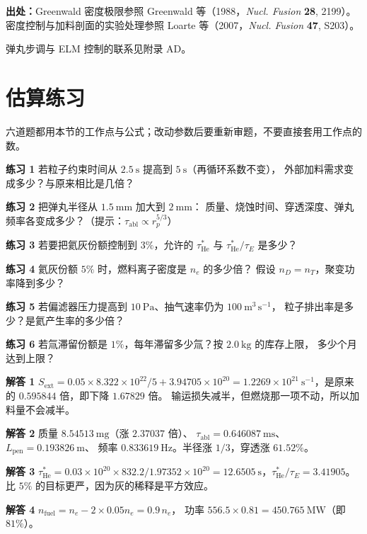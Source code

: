 {\footnotesize
\textbf{出处：}Greenwald 密度极限参照 Greenwald 等（1988，\emph{Nucl. Fusion} \textbf{28}, 2199）。
密度控制与加料剖面的实验处理参照 Loarte 等（2007，\emph{Nucl. Fusion} \textbf{47}, S203）。

弹丸步调与 ELM 控制的联系见附录 AD。
}

\section{估算练习}
\label{sec:app-aj-problems}

六道题都用本节的工作点与公式；改动参数后要重新审题，不要直接套用工作点的数。

\textbf{练习 1} 若粒子约束时间从 $2.5\ \mathrm{s}$ 提高到 $5\ \mathrm{s}$（再循环系数不变），
外部加料需求变成多少？与原来相比是几倍？

\textbf{练习 2} 把弹丸半径从 $1.5\ \mathrm{mm}$ 加大到 $2\ \mathrm{mm}$：
质量、烧蚀时间、穿透深度、弹丸频率各变成多少？（提示：$\tau_{\mathrm{abl}} \propto r_p^{5/3}$）

\textbf{练习 3} 若要把氦灰份额控制到 $3\%$，允许的 $\tau_{\mathrm{He}}^{*}$ 与
$\tau_{\mathrm{He}}^{*}/\tau_E$ 是多少？

\textbf{练习 4} 氦灰份额 $5\%$ 时，燃料离子密度是 $n_e$ 的多少倍？
假设 $n_D = n_T$，聚变功率降到多少？

\textbf{练习 5} 若偏滤器压力提高到 $10\ \mathrm{Pa}$、抽气速率仍为 $100\ \mathrm{m^{3}\,s^{-1}}$，
粒子排出率是多少？是氦产生率的多少倍？

\textbf{练习 6} 若氚滞留份额是 $1\%$，每年滞留多少氚？按 $2.0\ \mathrm{kg}$ 的库存上限，
多少个月达到上限？

\textbf{解答 1} $S_{\mathrm{ext}} = 0.05\times8.322\times10^{22}/5 + 3.94705\times10^{20}
= 1.2269\times10^{21}\ \mathrm{s^{-1}}$，是原来的 $0.595844$ 倍，即下降 $1.67829$ 倍。
输运损失减半，但燃烧那一项不动，所以加料量不会减半。

\textbf{解答 2} 质量 $8.54513\ \mathrm{mg}$（涨 $2.37037$ 倍）、
$\tau_{\mathrm{abl}} = 0.646087\ \mathrm{ms}$、$L_{\mathrm{pen}} = 0.193826\ \mathrm{m}$、
频率 $0.833619\ \mathrm{Hz}$。半径涨 $1/3$，穿透涨 $61.52\%$。

\textbf{解答 3} $\tau_{\mathrm{He}}^{*} = 0.03\times10^{20}\times832.2/1.97352\times10^{20}
= 12.6505\ \mathrm{s}$，$\tau_{\mathrm{He}}^{*}/\tau_E = 3.41905$。
比 $5\%$ 的目标更严，因为灰的稀释是平方效应。

\textbf{解答 4} $n_{\mathrm{fuel}} = n_e - 2\times0.05n_e = 0.9\,n_e$，
功率 $556.5\times0.81 = 450.765\ \mathrm{MW}$（即 $81\%$）。

